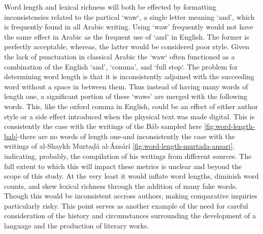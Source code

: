 \documentclass[12pt, oneside]{report}
\begin{document}
\par
Word length and lexical richness will both be effected by formatting inconsistensies related to the partical `waw`, a single letter meaning `and', which is frequently found in all Arabic writing. Using `waw' frequently would not have the same effect in Arabic as the frequent use of `and' in English.
The former is perfectly acceptable, whereas, the latter would be considered poor style.
Given the lack of punctuation in classical Arabic the `waw` often functioned as a combination of the English `and', `comma', and `full stop`.
The problem for determining word length is that it is inconsistently adjoined with the succeeding word without a space in between them.
Thus instead of having many words of length one, a significant portion of these `waws' are merged with the following words.
This, like the oxford comma in English, could be an effect of either author style or a side effect introduced when the physical text was made digital.
This is consistently the case with the writings of the B\'{a}b sampled here \autoref{fig:word-length-bab}-there are no words of length one-and inconsistently the case with the writings of al-Shaykh Murtaḍ\'{a} al-\'{A}ns\'{a}r\'{i} \autoref{fig:word-length-murtada-ansari}, indicating, probably, the compilation of his writings from different sources.
The full extent to which this will impact these metrics is unclear and beyond the scope of this study.
At the very least it would inflate word lengths, diminish word counts, and skew lexical richness through the addition of many fake words.
Though this would be inconsistent accross authors, making comparative inquiries particularly risky.
This point serves as another example of the need for careful consideration of the history and circumstances surrounding the development of a language and the production of literary works.
\par
\end{document}
